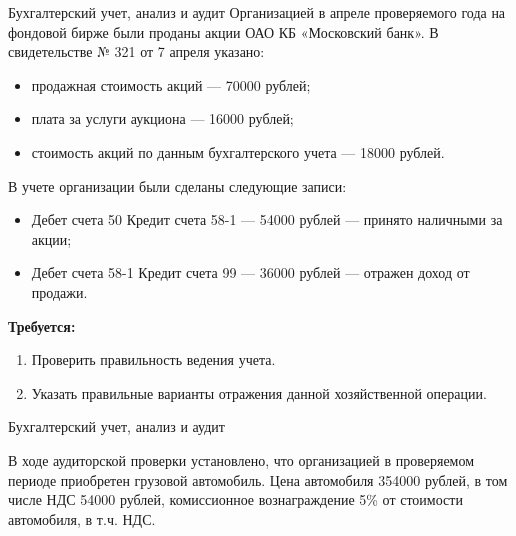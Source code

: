\documentclass[
	11pt,
	a4paper,
	]
	{article}
\begin{document}
 {Бухгалтерский учет, анализ и аудит}
\prGE
	Организацией в апреле проверяемого года на фондовой бирже были проданы акции ОАО КБ «Московский банк». В свидетельстве № 321 от 7 апреля указано: 

	\begin{itemize}
		\item продажная стоимость акций --- 70000 рублей;
		\item плата за услуги аукциона --- 16000 рублей;
		\item стоимость акций по данным бухгалтерского учета --- 18000 рублей.
	\end{itemize}

	В учете организации были сделаны следующие записи:
	\begin{itemize}
		\item Дебет счета 50 Кредит счета 58-1 --- 54000 рублей --- принято наличными за акции;
		\item Дебет счета 58-1 Кредит счета 99 --- 36000 рублей --- отражен доход от продажи.
	\end{itemize}

	\textbf{Требуется:}
	\begin{enumerate}
		\item Проверить правильность ведения учета. 
		\item Указать правильные варианты отражения данной хозяйственной операции.
	\end{enumerate}

\begin{center}\lowGE * \end{center}
\newpage







 {Бухгалтерский учет, анализ и аудит}
\prGE

	В ходе аудиторской проверки установлено, что организацией в проверяемом периоде приобретен грузовой автомобиль. Цена автомобиля 354000 рублей, в том числе НДС 54000 рублей, комиссионное вознаграждение 5\% от стоимости автомобиля, в т.ч. НДС. 
	\medskip
\end{document}
